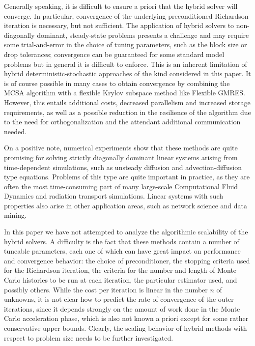 \documentclass[times]{nlaauth}
\begin{document}
Generally speaking, it is difficult to ensure a priori that the
hybrid solver will converge. In particular, convergence of the underlying
preconditioned Richardson iteration is necessary, but not sufficient.
The application of hybrid solvers to non-diagonally dominant, steady-state
problems presents a challenge and may require some trial-and-error in the
choice of tuning parameters, such as the block size or drop tolerances;
convergence can be guaranteed for some standard model problems but in
general it is difficult to enforce.
This is an inherent limitation of hybrid deterministic-stochastic
approaches of the kind considered in this paper. It is of course possible in many cases to obtain convergence by
combining the MCSA algorithm with a flexible Krylov subspace method like
Flexible GMRES. However, this entails additional costs, decreased parallelism and
increased storage requirements, as well as a possible reduction in the
resilience of the algorithm due to the need for orthogonalization and the
attendant additional communication needed.

On a positive note, numerical experiments show that these methods
are quite promising for solving strictly diagonally dominant linear systems
arising from time-dependent simulations, such as unsteady diffusion and
advection-diffusion type equations. Problems of this type are quite
important in practice, as they are often the most time-consuming part
of many large-scale Computational Fluid Dynamics and radiation transport simulations.
Linear systems with such properties also arise in other application areas,
such as network science and data mining.

In this paper we have not attempted to analyze the algorithmic scalability
of the hybrid solvers. A difficulty is the fact that these methods contain
a number of tuneable parameters, each one of which can have great impact on
performance and convergence behavior:
the choice of preconditioner, the stopping
criteria used for the Richardson iteration, the criteria for the number
and length of Monte Carlo histories to be run at each iteration, the
particular estimator used, and
possibly others. While the cost per iteration is linear in the
number $n$ of unknowns, it is not clear how to predict the rate of convergence of
the outer iterations, since it depends strongly on the amount of work
done in the Monte Carlo acceleration phase, which is also not known a
priori except for some rather conservative upper bounds. Clearly,
the scaling behavior of hybrid methods with respect to problem size
needs to be further investigated.
\end{document}
